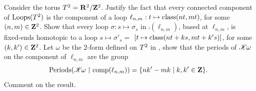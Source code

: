 \begin{exercise}
  \label{Periods-of-a-surface}
  Consider the torus $T^2 = {\mathbf R}^2/{\mathbf Z}^2$.
  Justify the fact that every connected component of $\operatorname{Loops}(T^2)$ is the component of a loop $\ell_{n,m} : t \mapsto \operatorname{class}(nt,mt)$,
  for some $(n,m) \in {\mathbf Z}^2$.
  Show that every loop $\sigma : s \mapsto \sigma_s$ in $\comp(\ell_{n,m})$,
  based at $\ell_{n,m}$,
  is fixed-ends homotopic to a loop $s \mapsto \sigma'_s =$
  \linebreak
  $[t \mapsto \operatorname{class}(nt+ks,mt+k's)]$, for some $(k,k') \in {\mathbf Z}^2$.
  Let $\omega$ be the $2$-form defined on $T^2$  in ,
  show that the periods of $\mathscr{K}\!\omega$ on the component of $\ell_{n,m}$ are the group
  $$%
  \PeriodsOf(\CHK\!\omega \restriction \comp(\ell_{n,m})) = \{nk'-mk \mid k,k' \in \ZZ\}.
  $$%
  Comment on the result.
\end{exercise} %
